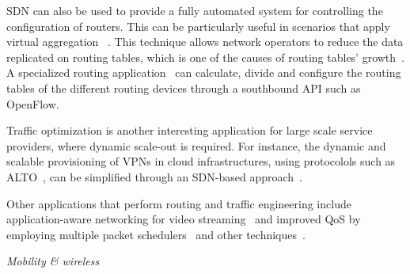 SDN can also be used to provide a fully automated system for controlling the configuration of routers.
This can be particularly useful in scenarios that apply virtual aggregation~\cite{ballani2009} .
This technique allows network operators to reduce the data replicated on routing tables, which 
is one of the causes of routing tables' growth~\cite{meyer2007}. 
A specialized routing application~\cite{skoldstrom2013-1} can calculate, divide and configure the routing tables of the different routing devices through a southbound API such 
as OpenFlow.

Traffic optimization is another interesting application for large scale service providers, where dynamic scale-out 
is required. For instance, the dynamic and scalable provisioning of VPNs in cloud infrastructures, using protocolols
such as ALTO~\cite{alimi2013}, can be simplified through an SDN-based approach~\cite{scharf2013}.

Other applications that perform routing and traffic engineering include application-aware 
networking for video streaming~\cite{jarschel2013} and improved QoS by employing multiple packet 
schedulers~\cite{ishimori2013} and other techniques~\cite{kim2010,jeong2012,egilmez2012, kumar2013}.

\vspace{2mm}
\noindent \textit{Mobility \& wireless}

